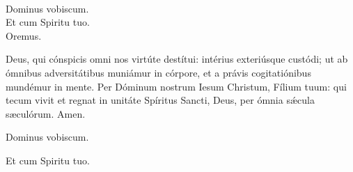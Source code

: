\\
  \rubric{\Vbar}Dominus vobiscum.
\\
  \rubric{\Rbar}Et cum Spiritu tuo.
\\
Oremus.

Deus, qui cónspicis omni nos virtúte destítui: intérius exteriúsque custódi; ut ab ómnibus adversitátibus muniámur in córpore, et a právis cogitatiónibus mundémur in mente. Per Dóminum nostrum Iesum Christum, Fílium tuum: qui tecum vivit et regnat in unitáte Spíritus Sancti, Deus, per ómnia sǽcula sæculórum.\rubric{\Rbar} Amen.

  \rubric{\Vbar}Dominus vobiscum.

  \rubric{\Rbar}Et cum Spiritu tuo.

